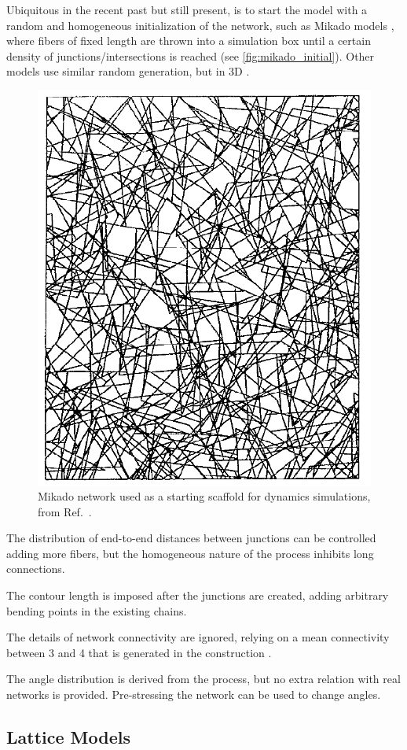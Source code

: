 Ubiquitous in the recent past but still present, is to start the model with a random and homogeneous initialization of the network, such as Mikado models \cite{wilhelm_elasticity_2003, astrom_microscopic_1994, schuster_investigating_2012, conti_cross-linked_2009, sharma_strain-controlled_2016, sharma_elastic_2013},
where fibers of fixed length are thrown into a simulation box until a certain density of junctions/intersections is reached (see \autoref{fig:mikado_initial}). Other models use similar random generation, but in 3D \cite{astrom_strain_2008}.
\begin{figure}[ht]
  \centering
  \includegraphics[width=0.4\linewidth]{Figures/chapter-intro/mikado_initial.png}
  \caption{Mikado network used as a starting scaffold for dynamics simulations, from Ref.~\cite{astrom_microscopic_1994}.}
  \label{fig:mikado_initial}
\end{figure}

The distribution of end-to-end distances between junctions can be controlled adding more fibers, but the homogeneous nature of the process inhibits long connections.

The contour length is imposed after the junctions are created, adding arbitrary bending points in the existing chains.

The details of network connectivity are ignored, relying on a mean connectivity between 3 and 4 that is generated in the construction \cite{sharma_strain-controlled_2016}.

The angle distribution is derived from the process, but no extra relation with real networks is provided. Pre-stressing the network can be used to change angles.

\subsection{Lattice Models}%
\label{sub:lattice_models}

